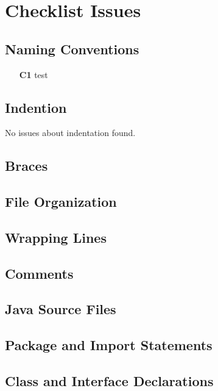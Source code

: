 \section{Checklist Issues}

\subsection{Naming Conventions}
	\begin{itemize}
		\item[\textbf{C1}] test
	\end{itemize}

\subsection{Indention}
No issues about indentation found.

\subsection{Braces}
\blindtext

\subsection{File Organization}
\blindtext

\subsection{Wrapping Lines}
\blindtext

\subsection{Comments}
\blindtext

\subsection{Java Source Files}
\blindtext

\subsection{Package and Import Statements}
\blindtext

\subsection{Class and Interface Declarations}
\blindtext

